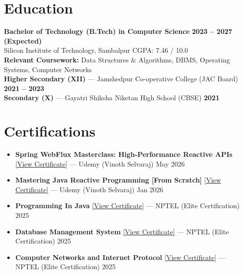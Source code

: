 \documentclass[a4paper,10pt]{article}
\begin{document}
\section{Education}
{\small\color{bodyText}
\textbf{Bachelor of Technology (B.Tech) in Computer Science} \hfill \textbf{2023 -- 2027 (Expected)}\\
Silicon Institute of Technology, Sambalpur \hfill CGPA: 7.46 / 10.0\\[0.2em]
\textbf{Relevant Coursework:} Data Structures \& Algorithms, DBMS, Operating Systems, Computer Networks\\[0.2em]
\textbf{Higher Secondary (XII)} --- Jamshedpur Co-operative College (JAC Board) \hfill \textbf{2021 -- 2023}\\[0.2em]
\textbf{Secondary (X)} --- Gayatri Shiksha Niketan High School (CBSE) \hfill \textbf{2021}
}

\section{Certifications}
{\small\color{bodyText}
\begin{itemize}[leftmargin=1.2em, topsep=2pt, itemsep=1pt, parsep=0pt]
    \item \textbf{Spring WebFlux Masterclass: High-Performance Reactive APIs}
    \href{https://www.ramjeeprasad.online/Spring_WebFlux_Masterclass_High-Performance_Reactive_APIs_Ramjee.jpg}{\textcolor{linkBlue}{[View Certificate]}}
    --- Udemy (Vinoth Selvaraj) \hfill May 2026
    \item \textbf{Mastering Java Reactive Programming [From Scratch]}
    \href{https://www.ramjeeprasad.online/Mastering_Java_Reactive_Programming_Ramjee.jpg}{\textcolor{linkBlue}{[View Certificate]}}
    --- Udemy (Vinoth Selvaraj) \hfill Jan 2026
    \item \textbf{Programming In Java}
    \href{https://www.ramjeeprasad.online/Programming_In_Java_Ramjee.jpg}{\textcolor{linkBlue}{[View Certificate]}}
    --- NPTEL (Elite Certification) \hfill 2025
    \item \textbf{Database Management System}
    \href{https://www.ramjeeprasad.online/Data_Base_Management_System_Ramjee.jpg}{\textcolor{linkBlue}{[View Certificate]}}
    --- NPTEL (Elite Certification) \hfill 2025
    \item \textbf{Computer Networks and Internet Protocol}
    \href{https://www.ramjeeprasad.online/Computer_Networks_and_Internet_Protocol_Ramjee.jpg}{\textcolor{linkBlue}{[View Certificate]}}
    --- NPTEL (Elite Certification) \hfill 2025
\end{itemize}
}
\end{document}
